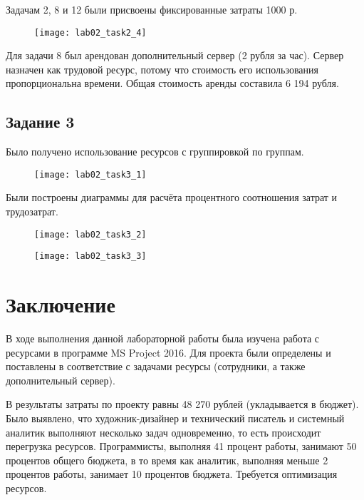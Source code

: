 Задачам 2, 8 и 12 были присвоены фиксированные затраты 1000 р.

\begin{figure}[h!]
	\texttt{[image: lab02\_task2\_4]}
\end{figure}

Для задачи 8 был арендован дополнительный сервер (2 рубля за час). Сервер назначен как трудовой ресурс, потому что стоимость его использования пропорциональна времени. Общая стоимость аренды составила 6 194 рубля.
\clearpage

\subsection*{Задание 3}

Было получено использование ресурсов с группировкой по группам.
\begin{figure}[h!]
	\texttt{[image: lab02\_task3\_1]}
\end{figure}

Были построены диаграммы для расчёта процентного соотношения затрат и трудозатрат.

\begin{figure}[h!]
	\texttt{[image: lab02\_task3\_2]}
\end{figure}

\begin{figure}[h!]
	\texttt{[image: lab02\_task3\_3]}
\end{figure}


\clearpage

\section*{Заключение}

В ходе выполнения данной лабораторной работы была изучена работа с ресурсами в программе MS Project 2016. Для проекта были определены и поставлены в соответствие с задачами ресурсы (сотрудники, а также дополнительный сервер).

В результаты затраты по проекту равны 48 270 рублей (укладывается в бюджет).
Было выявлено, что художник-дизайнер и технический писатель и системный аналитик выполняют несколько задач одновременно, то есть происходит перегрузка ресурсов.
Программисты, выполняя 41 процент работы, занимают 50 процентов общего бюджета, в то время как аналитик, выполняя меньше 2 процентов работы, занимает 10 процентов бюджета.
Требуется оптимизация ресурсов.